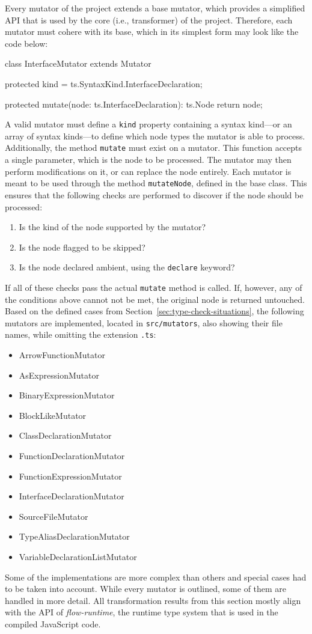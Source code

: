 Every mutator of the project extends a base mutator, which provides a simplified API that is used by the core (i.e., transformer) of the project. Therefore, each mutator must cohere with its base, which in its simplest form may look like the code below:
\begin{JsCode}[numbers=none]
class InterfaceMutator extends Mutator {

  protected kind = ts.SyntaxKind.InterfaceDeclaration;
  
  protected mutate(node: ts.InterfaceDeclaration): ts.Node {
    return node;
  }

}
\end{JsCode}
A valid mutator must define a \texttt{kind} property containing a syntax kind---or an array of syntax kinds---to define which node types the mutator is able to process. Additionally, the method \texttt{mutate} must exist on a mutator. This function accepts a single parameter, which is the node to be processed. The mutator may then perform modifications on it, or can replace the node entirely. Each mutator is meant to be used through the method \texttt{mutateNode}, defined in the base class. This ensures that the following checks are performed to discover if the node should be processed:
\begin{enumerate}
  \item Is the kind of the node supported by the mutator?
  \item Is the node flagged to be skipped?
  \item Is the node declared ambient, using the \texttt{declare} keyword?
\end{enumerate}
If all of these checks pass the actual \texttt{mutate} method is called. If, however, any of the conditions above cannot not be met, the original node is returned untouched. Based on the defined cases from Section~\ref{sec:type-check-situations}, the following mutators are implemented, located in \texttt{src/mutators}, also showing their file names, while omitting the extension \texttt{.ts}:
\begin{itemize}
  \item ArrowFunctionMutator
  \item AsExpressionMutator
  \item BinaryExpressionMutator
  \item BlockLikeMutator
  \item ClassDeclarationMutator
  \item FunctionDeclarationMutator
  \item FunctionExpressionMutator
  \item InterfaceDeclarationMutator
  \item SourceFileMutator
  \item TypeAliasDeclarationMutator
  \item VariableDeclarationListMutator
\end{itemize}
Some of the implementations are more complex than others and special cases had to be taken into account. While every mutator is outlined, some of them are handled in more detail. All transformation results from this section mostly align with the API of \emph{flow-runtime}, the runtime type system that is used in the compiled JavaScript code.

